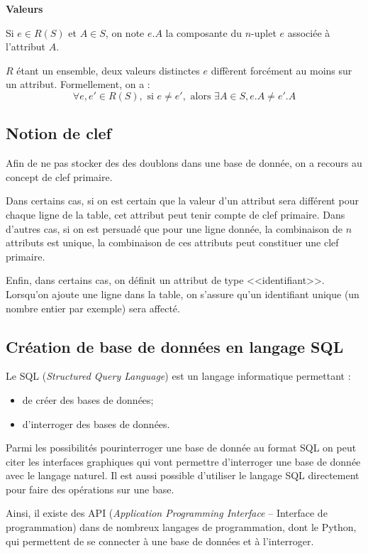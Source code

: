 \documentclass[10pt]{article}
\begin{document}
\begin{defi}
\textbf{Valeurs}

Si $e\in R(S)$ et $A\in S$, on note $e.A$ la composante du $n$-uplet $e$ associée à l'attribut $A$. 

$R$ étant un ensemble, deux valeurs distinctes $e$ diffèrent forcément au moins sur un attribut.  Formellement, on a : 
$$
\forall e,e' \in R(S), \text{ si } e\neq e', \text{ alors } \exists A \in S, e.A \neq e'.A
$$

\end{defi}

\subsection{Notion de clef}
Afin de ne pas stocker des des doublons dans une base de donnée, on a recours au concept de clef primaire. 

Dans certains cas, si on est certain que la valeur d'un attribut sera différent pour chaque ligne de la table, cet attribut peut tenir compte de clef primaire. Dans d'autres cas, si on est persuadé que pour une ligne donnée, la combinaison de $n$ attributs est unique, la combinaison de ces attributs peut constituer une clef primaire. 

Enfin, dans certains cas, on définit un attribut de type <<identifiant>>. Lorsqu'on ajoute une ligne dans la table, on s'assure qu'un identifiant unique (un nombre entier par exemple) sera affecté.

\subsection{Création de base de données en langage SQL}
Le SQL (\textit{Structured Query Language}) est un langage informatique permettant :
\begin{itemize}
\item de créer des bases de données;
\item d'interroger des bases de données.
\end{itemize}

Parmi les possibilités pourinterroger une base de donnée au format SQL on peut citer les interfaces graphiques qui vont permettre d'interroger une base de donnée avec le langage naturel. Il est aussi possible d'utiliser le langage SQL directement pour faire des opérations sur une base. 

\begin{exemple}
Ainsi, il existe des API (\textit{Application Programming Interface} -- Interface de programmation) dans de nombreux langages de programmation, dont le Python, qui permettent de se connecter à une base de données et à l'interroger. 

\end{exemple}
\end{document}
